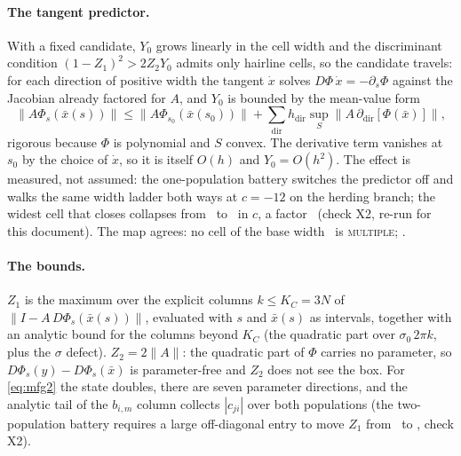 \documentclass[11pt]{article}
\theoremstyle{definition}
\newcommand{\MULT}{\textup{\textsc{multiple}}}
\begin{document}
\paragraph{The tangent predictor.} With a fixed candidate, $Y_0$ grows linearly in the cell width and the discriminant condition $(1-Z_1)^2>2Z_2Y_0$ admits only hairline cells, so the candidate travels: for each direction of positive width the tangent $\dot x$ solves $D\Phi\,\dot x=-\partial_s\Phi$ against the Jacobian already factored for $A$, and $Y_0$ is bounded by the mean-value form
\[
\|A\Phi_s(\bar x(s))\|\le\|A\Phi_{s_0}(\bar x(s_0))\|+\sum_{\mathrm{dir}}h_{\mathrm{dir}}\sup_{S}\|A\,\partial_{\mathrm{dir}}[\Phi(\bar x)]\|,
\]
rigorous because $\Phi$ is polynomial and $S$ convex. The derivative term vanishes at $s_0$ by the choice of $\dot x$, so it is itself $O(h)$ and $Y_0=O(h^2)$. The effect is measured, not assumed: the one-population battery switches the predictor off and walks the same width ladder both ways at $c=-12$ on the herding branch; the widest cell that closes collapses from \BatOneXtwoLive\ to \BatOneXtwoFrozen\ in $c$, a factor \BatOneXtwoRatio\ (check X2, re-run for this document). The map agrees: no cell of the base width \OneBaseC\ is \MULT; \OneMultWidthText.

\paragraph{The bounds.} $Z_1$ is the maximum over the explicit columns $k\le K_C=3N$ of $\|I-A\,D\Phi_s(\bar x(s))\|$, evaluated with $s$ and $\bar x(s)$ as intervals, together with an analytic bound for the columns beyond $K_C$ (the quadratic part over $\sigma_0\,2\pi k$, plus the $\sigma$ defect). $Z_2=2\|A\|$: the quadratic part of $\Phi$ carries no parameter, so $D\Phi_s(y)-D\Phi_s(\bar x)$ is parameter-free and $Z_2$ does not see the box. For \eqref{eq:mfg2} the state doubles, there are seven parameter directions, and the analytic tail of the $b_{i,m}$ column collects $|c_{ji}|$ over both populations (the two-population battery requires a large off-diagonal entry to move $Z_1$ from \BatTwoXtwoFrom\ to \BatTwoXtwoTo, check X2).
\end{document}
